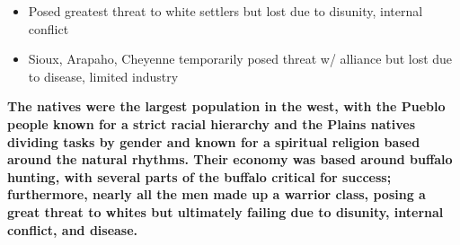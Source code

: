 \documentclass[a4paper]{article}
\begin{document}
{\begin{itemize}
\begin{itemize}
\begin{itemize}
                \item Posed greatest threat to white settlers but lost due to disunity, internal conflict
                \item Sioux, Arapaho, Cheyenne temporarily posed threat w/ alliance but lost due to disease, limited industry
            \end{itemize}
        \end{itemize}
    \end{itemize}
    \textbf{The natives were the largest population in the west, with the Pueblo people known for a strict racial hierarchy and the Plains natives dividing tasks by gender and known for a spiritual religion based around the natural rhythms. Their economy was based around buffalo hunting, with several parts of the buffalo critical for success; furthermore, nearly all the men made up a warrior class, posing a great threat to whites but ultimately failing due to disunity, internal conflict, and disease.}}
\end{document}
